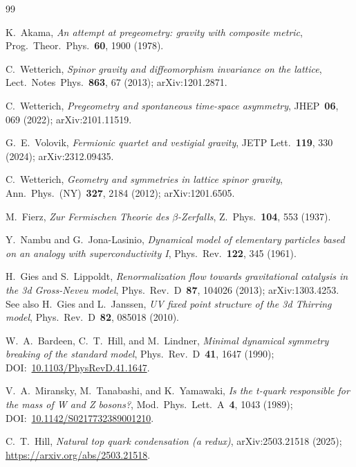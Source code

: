 \documentclass[aps,prd,twocolumn,showpacs,superscriptaddress,nofootinbib]{revtex4-2}
\begin{document}

\begin{thebibliography}{99}

K.~Akama,
\emph{An attempt at pregeometry: gravity with composite metric},
Prog.~Theor.~Phys.~\textbf{60}, 1900 (1978).

C.~Wetterich,
\emph{Spinor gravity and diffeomorphism invariance on the lattice},
Lect.~Notes~Phys.~\textbf{863}, 67 (2013); arXiv:1201.2871.

C.~Wetterich,
\emph{Pregeometry and spontaneous time-space asymmetry},
JHEP~\textbf{06}, 069 (2022); arXiv:2101.11519.

G.~E.~Volovik,
\emph{Fermionic quartet and vestigial gravity},
JETP Lett.~\textbf{119}, 330 (2024); arXiv:2312.09435.

C.~Wetterich,
\emph{Geometry and symmetries in lattice spinor gravity},
Ann.~Phys.~(NY)~\textbf{327}, 2184 (2012); arXiv:1201.6505.

M.~Fierz,
\emph{Zur Fermischen Theorie des $\beta$-Zerfalls},
Z.~Phys.~\textbf{104}, 553 (1937).

Y.~Nambu and G.~Jona-Lasinio,
\emph{Dynamical model of elementary particles based on an analogy with superconductivity I},
Phys.~Rev.~\textbf{122}, 345 (1961).

H.~Gies and S.~Lippoldt,
\emph{Renormalization flow towards gravitational catalysis in the 3d Gross-Neveu model},
Phys.~Rev.~D~\textbf{87}, 104026 (2013); arXiv:1303.4253. See also H.~Gies and L.~Janssen,
\emph{UV fixed point structure of the 3d Thirring model},
Phys.~Rev.~D~\textbf{82}, 085018 (2010).

W.~A.~Bardeen, C.~T.~Hill, and M.~Lindner,
\emph{Minimal dynamical symmetry breaking of the standard model},
Phys.~Rev.~D~\textbf{41}, 1647 (1990); DOI:~\href{https://doi.org/10.1103/PhysRevD.41.1647}{10.1103/PhysRevD.41.1647}.

V.~A.~Miransky, M.~Tanabashi, and K.~Yamawaki,
\emph{Is the t-quark responsible for the mass of W and Z bosons?},
Mod.~Phys.~Lett.~A~\textbf{4}, 1043 (1989); DOI:~\href{https://doi.org/10.1142/S0217732389001210}{10.1142/S0217732389001210}.

C.~T.~Hill,
\emph{Natural top quark condensation (a redux)},
arXiv:2503.21518 (2025); \url{https://arxiv.org/abs/2503.21518}.


\end{thebibliography}
\end{document}
